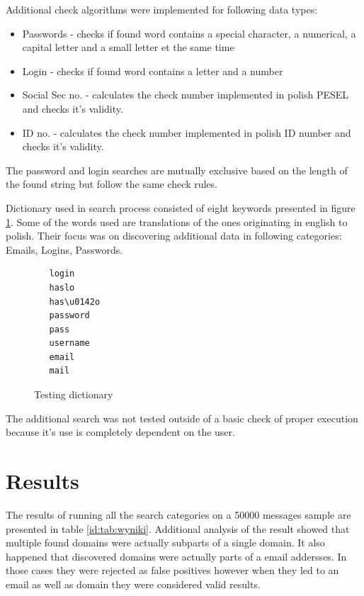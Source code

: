 \documentclass[a4paper,twoside,12pt]{book}
\begin{document}
Additional check algorithms were implemented for following data types:

\begin{itemize}
   \item Passwords - checks if found word contains a special character, a numerical, a capital letter and a small letter et the same time
   \item Login - checks if found word contains a letter and a number
   \item Social Sec no. - calculates the check number implemented in polish PESEL and checks it's validity.
   \item ID no. - calculates the check number implemented in polish ID number and checks it's validity.
\end{itemize}

The password and login searches are mutually exclusive based on the length of the found string but follow the same
check rules.

Dictionary used in search process consisted of eight keywords presented in figure \ref{fig:dictionary}. 
Some of the words used are translations of the ones originating in english to polish. Their focus was on discovering
additional data in following categories: Emails, Logins, Passwords.

\begin{figure}
   \centering
   \begin{lstlisting}
   login
   haslo
   has\u0142o
   password
   pass
   username
   email
   mail
   \end{lstlisting}
   \caption{Testing dictionary}
   \label{fig:dictionary}
\end{figure}

The additional search was not tested outside of a basic check of proper execution because it's use is completely dependent on the user.

\section{Results}

The results of running all the search categories on a 50000 messages sample are presented in table \ref{id:tab:wyniki}.
Additional analysis of the result showed that multiple found domains were actually subparts of a single
domain. It also happened that discovered domains were actually parts of a email addersses. In those cases
they were rejected as false positives however when they led to an email as well as domain they 
were considered valid results. 
\end{document}
